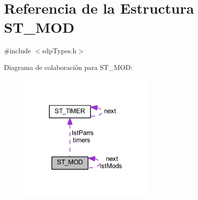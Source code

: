 \hypertarget{struct_s_t___m_o_d}{}\section{Referencia de la Estructura S\+T\+\_\+\+M\+O\+D}
\label{struct_s_t___m_o_d}


{\ttfamily \#include $<$sdp\+Types.\+h$>$}



Diagrama de colaboración para S\+T\+\_\+\+M\+O\+D\+:\nopagebreak
\begin{figure}[H]
\begin{center}
\leavevmode
\includegraphics[width=193pt]{struct_s_t___m_o_d__coll__graph}
\end{center}
\end{figure}
